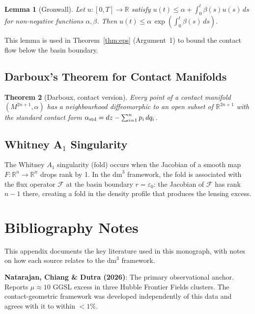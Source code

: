 \documentclass[11pt,a4paper,openright]{book}
\theoremstyle{dm3thm}
\newtheorem{theorem}{Theorem}[chapter]
\newtheorem{lemma}[theorem]{Lemma}
\theoremstyle{dm3def}
\newcommand{\dm}{\mathrm{dm}^3}
\newcommand{\eps}{\varepsilon_0}
\newcommand{\FF}{\mathcal{F}}
\begin{document}
\begin{lemma}[Gronwall]\label{lem:gronwall}
Let $u:[0,T]\to\mathbb{R}$ satisfy $u(t) \leq \alpha + \int_0^t \beta(s) u(s)\,ds$
for non-negative functions $\alpha, \beta$.  Then
$u(t) \leq \alpha\,\exp\!\left(\int_0^t \beta(s)\,ds\right)$.
\end{lemma}

This lemma is used in Theorem~\ref{thm:eps} (Argument~1) to bound the
contact flow below the basin boundary.

\section{Darboux's Theorem for Contact Manifolds}

\begin{theorem}[Darboux, contact version]
Every point of a contact manifold $(M^{2n+1}, \alpha)$ has a neighbourhood
diffeomorphic to an open subset of $\mathbb{R}^{2n+1}$ with the standard
contact form $\alpha_{\rm std} = dz - \sum_{i=1}^n p_i\,dq_i$.
\end{theorem}

\section{Whitney A$_1$ Singularity}

The Whitney $A_1$ singularity (fold) occurs when the Jacobian of a smooth
map $F: \mathbb{R}^n \to \mathbb{R}^n$ drops rank by 1.  In the $\dm$
framework, the fold is associated with the flux operator $\FF$ at the
basin boundary $r = \eps$: the Jacobian of $\FF$ has rank $n-1$ there,
creating a fold in the density profile that produces the lensing excess.

\chapter{Bibliography Notes}
\label{app:bibnotes}

This appendix documents the key literature used in this monograph, with
notes on how each source relates to the $\dm$ framework.

\textbf{Natarajan, Chiang \& Dutra (2026)}: The primary observational anchor.
Reports $\mu \approx 10$ GGSL excess in three Hubble Frontier Fields clusters.
The contact-geometric framework was developed independently of this data and
agrees with it to within $<1\%$.
\end{document}

